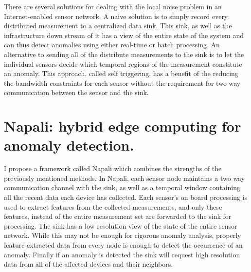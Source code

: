 There are several solutions for dealing with the local noise problem in an Internet-enabled sensor network. A naive solution is to simply record every distributed measurement to a centralized data sink. This sink, as well as the infrastructure down stream of it has a view of the entire state of the system and can thus detect anomalies using either real-time or batch processing. An alternative to sending all of the distribute measurements to the sink is to let the individual sensors decide which temporal regions of the measurement constitute an anomaly. This approach, called self triggering, has a benefit of the reducing the bandwidth constraints for each sensor without the requirement for two way communication between the sensor and the sink.

\section{Napali: hybrid edge computing for anomaly detection.} \label{intro:section:napali}
  
I propose a framework called Napali which combines the strengths of the previously mentioned methods. In Napali, each sensor node maintains a two way communication channel with the sink, as well as a temporal window containing all the recent data each device has collected. Each sensor's on board processing is used to extract features from the collected measurements, and only these features, instead of the entire measurement set are forwarded to the sink for processing. The sink has a low resolution view of the state of the entire sensor network. While this may not be enough for rigorous anomaly analysis, properly feature extracted data from every node is enough to detect the occurrence of an anomaly. Finally if an anomaly is detected the sink will request high resolution data from all of the affected devices and their neighbors. 

